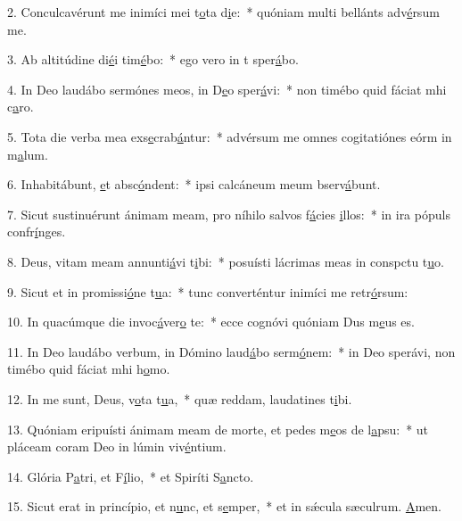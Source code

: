 2. Conculcavérunt me inimíci mei t\uline{o}ta d\uline{i}e:~* quóniam multi bellánts adv\uline{é}rsum me.\par 
3. Ab altitúdine di\uline{é}i tim\uline{é}bo:~* ego vero in t sper\uline{á}bo.\par 
4. In Deo laudábo sermónes meos, in D\uline{e}o sper\uline{á}vi:~* non timébo quid fáciat mhi c\uline{a}ro.\par 
5. Tota die verba mea exs\uline{e}crab\uline{á}ntur:~* advérsum me omnes cogitatiónes eórm in m\uline{a}lum.\par 
6. Inhabitábunt, \uline{e}t absc\uline{ó}ndent:~* ipsi calcáneum meum bserv\uline{á}bunt.\par 
7. Sicut sustinuérunt ánimam meam, pro níhilo salvos f\uline{á}cies \uline{i}llos:~* in ira pópuls confr\uline{í}nges.\par 
8. Deus, vitam meam annunti\uline{á}vi t\uline{i}bi:~* posuísti lácrimas meas in conspctu t\uline{u}o.\par 
9. Sicut et in promissi\uline{ó}ne t\uline{u}a:~* tunc converténtur inimíci me retr\uline{ó}rsum:\par 
10. In quacúmque die invoc\uline{á}ver\uline{o} te:~* ecce cognóvi quóniam Dus m\uline{e}us es.\par 
11. In Deo laudábo verbum, in Dómino laud\uline{á}bo serm\uline{ó}nem:~* in Deo sperávi, non timébo quid fáciat mhi h\uline{o}mo.\par 
12. In me sunt, Deus, v\uline{o}ta t\uline{u}a,~* quæ reddam, laudatines t\uline{i}bi.\par 
13. Quóniam eripuísti ánimam meam de morte, et pedes m\uline{e}os de l\uline{a}psu:~* ut pláceam coram Deo in lúmin viv\uline{é}ntium.\par 
14. Glória P\uline{a}tri, et F\uline{í}lio,~* et Spiríti S\uline{a}ncto.\par 
15. Sicut erat in princípio, et n\uline{u}nc, et s\uline{e}mper,~* et in sǽcula sæculrum. \uline{A}men.\par 

